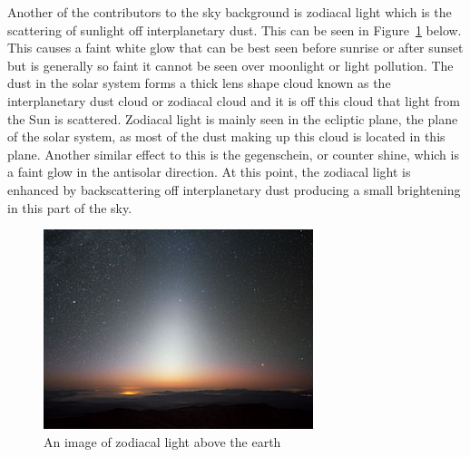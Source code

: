		Another of the contributors to the sky background is zodiacal light which is the scattering of sunlight off interplanetary dust\cite[p.~5--6]{MNRMNR21602}. This can be seen in Figure~\ref{fig:zodiacal_light} below. This causes a faint white glow that can be best seen before sunrise or after sunset but is generally so faint it cannot be seen over moonlight or light pollution. The dust in the solar system forms a thick lens shape cloud known as the interplanetary dust cloud or zodiacal cloud and it is off this cloud that light from the Sun is scattered. Zodiacal light is mainly seen in the ecliptic plane, the plane of the solar system, as most of the dust making up this cloud is located in this plane. Another similar effect to this is the gegenschein, or counter shine, which is a faint glow in the antisolar direction\cite{Observational_Studies_of_Interplanetary_Dust}. At this point, the zodiacal light is enhanced by backscattering off interplanetary dust producing a small brightening in this part of the sky.
		\begin{figure}[!htbp]
			\centering
			\includegraphics[width=0.7\textwidth]{../Images/zodiacal_light.jpeg}
			\caption{An image of zodiacal light above the earth}\label{fig:zodiacal_light}
		\end{figure}

